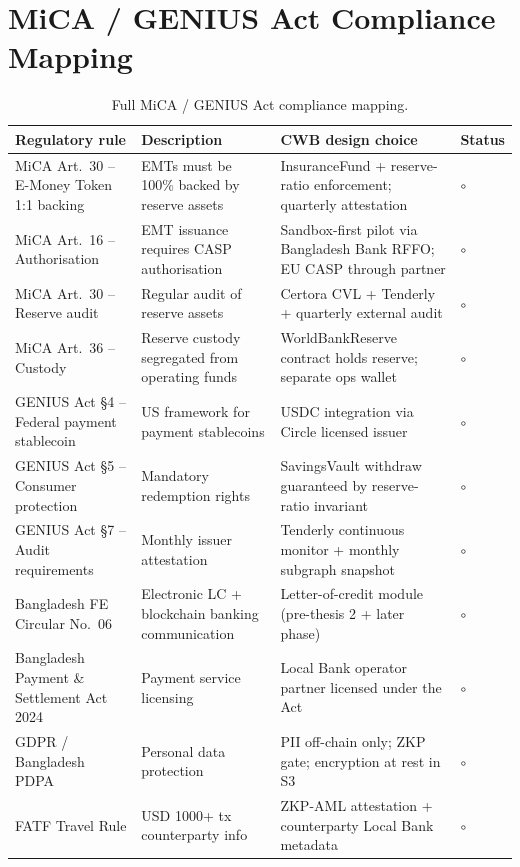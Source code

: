 \documentclass[12pt,a4paper]{report}
\newcommand{\tmarkPlanned}{$\circ$}
\begin{document}
\chapter{MiCA / GENIUS Act Compliance Mapping}
\label{app:compliance}

\begin{table}[!t]
\centering
\caption{Full MiCA / GENIUS Act compliance mapping.}
\label{tab:compliance-full}
\small
\begin{tabularx}{\linewidth}{@{}p{3.6cm}YYL{1.7cm}@{}}
\toprule
\textbf{Regulatory rule} & \textbf{Description} & \textbf{CWB design choice} & \textbf{Status} \\
\midrule
MiCA Art.\ 30 -- E-Money Token 1:1 backing & EMTs must be 100\% backed by reserve assets & InsuranceFund + reserve-ratio enforcement; quarterly attestation & \tmarkPlanned \\
MiCA Art.\ 16 -- Authorisation & EMT issuance requires CASP authorisation & Sandbox-first pilot via Bangladesh Bank RFFO; EU CASP through partner & \tmarkPlanned \\
MiCA Art.\ 30 -- Reserve audit & Regular audit of reserve assets & Certora CVL + Tenderly + quarterly external audit & \tmarkPlanned \\
MiCA Art.\ 36 -- Custody & Reserve custody segregated from operating funds & WorldBankReserve contract holds reserve; separate ops wallet & \tmarkPlanned \\
GENIUS Act \S 4 -- Federal payment stablecoin & US framework for payment stablecoins & USDC integration via Circle licensed issuer & \tmarkPlanned \\
GENIUS Act \S 5 -- Consumer protection & Mandatory redemption rights & SavingsVault withdraw guaranteed by reserve-ratio invariant & \tmarkPlanned \\
GENIUS Act \S 7 -- Audit requirements & Monthly issuer attestation & Tenderly continuous monitor + monthly subgraph snapshot & \tmarkPlanned \\
Bangladesh FE Circular No.~06 & Electronic LC + blockchain banking communication & Letter-of-credit module (pre-thesis 2 + later phase) & \tmarkPlanned \\
Bangladesh Payment \& Settlement Act 2024 & Payment service licensing & Local Bank operator partner licensed under the Act & \tmarkPlanned \\
GDPR / Bangladesh PDPA & Personal data protection & PII off-chain only; ZKP gate; encryption at rest in S3 & \tmarkPlanned \\
FATF Travel Rule & USD 1000+ tx counterparty info & ZKP-AML attestation + counterparty Local Bank metadata & \tmarkPlanned \\
\bottomrule
\end{tabularx}
\end{table}
\end{document}
